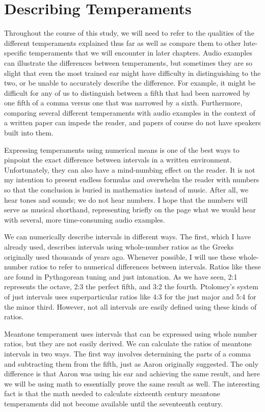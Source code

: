 \section{Describing Temperaments}

Throughout the course of this study, we will need to refer to the qualities of the
different temperaments explained thus far as well as compare them to other lute-specific
temperaments that we will encounter in later chapters.  Audio examples can illustrate the
differences between temperaments, but sometimes they are so slight that even the most
trained ear might have difficulty in distinguishing to the two, or be unable to accurately
describe the difference. For example, it might be difficult for any of us to distinguish
between a fifth that had been narrowed by one fifth of a comma versus one that was
narrowed by a sixth.  Furthermore, comparing several different temperaments with audio
examples in the context of a written paper can impede the reader, and papers of course do
not have speakers built into them.

Expressing temperaments using numerical means is one of the best ways to pinpoint the
exact difference between intervals in a written environment.  Unfortunately, they can also
have a mind-numbing effect on the reader.  It is not my intention to present
endless formulas and overwhelm the reader with numbers so that the conclusion is buried in
mathematics instead of music.  After all, we hear tones and sounds; we do not hear
numbers. I hope that the numbers will serve as musical shorthand, representing briefly on
the page what we would hear with several, more time-consuming audio examples.

We can numerically describe intervals in different ways.  The first, which I have already
used, describes intervals using whole-number ratios as the Greeks originally used
thousands of years ago.  Whenever possible, I will use these whole-number ratios to refer
to numerical differences between intervals.  Ratios like these are found in Pythagorean
tuning and just intonation.  As we have seen, 2:1 represents the octave, 2:3 the perfect
fifth, and 3:2 the fourth.  Ptolomey's system of just intervals uses superparticular
ratios like 4:3 for the just major and 5:4 for the minor third.  However, not all
intervals are easily defined using these kinds of ratios.

Meantone temperament uses intervals that can be expressed using whole number ratios, but
they are not easily derived.  We can calculate the ratios of meantone intervals in two
ways. The first way involves determining the parts of a comma and subtracting them from
the fifth, just as Aaron originally suggested.  The only difference is that Aaron was
using his ear and achieving the same result, and here we will be using math to essentially
prove the same result as well.  The interesting fact is that the math needed to calculate
sixteenth century meantone temperaments did not become available until the seventeenth
century.

